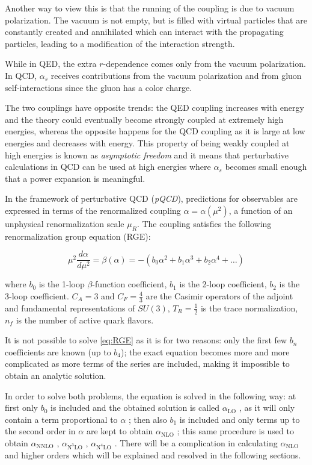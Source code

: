 \documentclass[../main.tex]{subfiles}
\begin{document}
Another way to view this is that the running of the coupling is due to vacuum polarization. The vacuum is not empty, but is filled 
with virtual particles that are constantly created and annihilated which can interact with the propagating particles,
leading to a modification of the interaction strength. 

While in QED, the extra $r$-dependence comes only from the vacuum polarization. In QCD, 
$\alpha_s$ receives contributions from the vacuum polarization and from gluon self-interactions since the gluon 
has a color charge.

The two couplings have opposite trends: the QED coupling increases with energy and the theory could eventually become strongly
coupled at extremely high energies, whereas the opposite happens for the QCD coupling as it is large at low
energies and decreases with energy. This property of being weakly coupled at high energies is
known as \emph{asymptotic freedom} and it means that perturbative calculations in QCD can be used at high energies where $\alpha_s$ becomes small enough that a power expansion is meaningful.

In the framework of perturbative QCD (\emph{pQCD}), predictions for observables are expressed in
terms of the renormalized coupling $\alpha = \alpha (\mu^2)$, a function of an unphysical renormalization scale
$\mu_R$. 
The coupling satisfies the following renormalization group equation (RGE):

\begin{equation}\label{eq:RGE}
    \mu^2 \frac{d\alpha}{d\mu^2} = \beta(\alpha) = -\left( b_0 \alpha^2 + b_1 \alpha^3 + b_2 \alpha^4 + \ldots \right)
\end{equation}

where $b_0$ is the 1-loop $\beta$-function coefficient,  
$b_1$ is the 2-loop coefficient, 
$b_2$ is the 3-loop coefficient.
$C_A = 3$ and $C_F = \frac{4}{3}$ are the Casimir operators of the adjoint and fundamental representations of $SU(3)$,
$T_R = \frac{1}{2}$ is the trace normalization, $n_f$ is the number of active quark flavors. 

It is not possible to solve \cref{eq:RGE} as it is for two reasons: only the first few $b_n$ 
coefficients are known (up to $b_4$); the exact equation becomes more and more complicated 
as more terms of the series are included, making it impossible to obtain an analytic solution.

In order to solve both problems, the equation is solved in the following way: at first only $b_0$
is included and the obtained solution is called $\alpha_{\text{LO}}$ , as it will only contain a term proportional to
$\alpha$ ; then also $b_1$ is included and only terms up to the second order in $\alpha$ are kept to obtain $\alpha_{\text{NLO}}$ ;
this same procedure is used to obtain $\alpha_{\text{NNLO}}$ , $\alpha_{\text{N}^3\text{LO}}$ , $\alpha_{\text{N}^4\text{LO}}$ . There will be a complication in
calculating $\alpha_{\text{NLO}}$ and higher orders which will be explained and resolved in the following sections.
\end{document}
